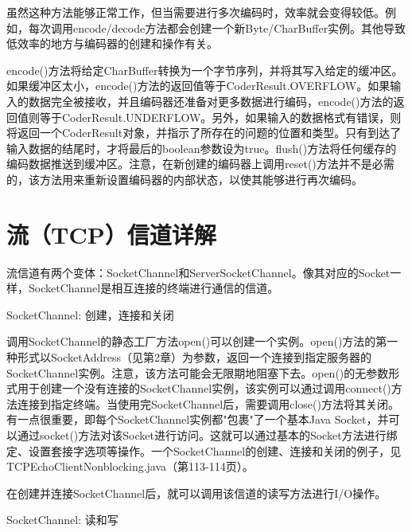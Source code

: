 		

		虽然这种方法能够正常工作，但当需要进行多次编码时，效率就会变得较低。例如，每次调用encode/decode方法都会创建一个新Byte/CharBuffer实例。其他导致低效率的地方与编码器的创建和操作有关。 

		

		encode()方法将给定CharBuffer转换为一个字节序列，并将其写入给定的缓冲区。如果缓冲区太小，encode()方法的返回值等于CoderResult.OVERFLOW。如果输入的数据完全被接收，并且编码器还准备对更多数据进行编码，encode()方法的返回值则等于CoderResult.UNDERFLOW。另外，如果输入的数据格式有错误，则将返回一个CoderResult对象，并指示了所存在的问题的位置和类型。只有到达了输入数据的结尾时，才将最后的boolean参数设为true。flush()方法将任何缓存的编码数据推送到缓冲区。注意，在新创建的编码器上调用reset()方法并不是必需的，该方法用来重新设置编码器的内部状态，以使其能够进行再次编码。 

\section{流（TCP）信道详解} 

	流信道有两个变体：SocketChannel和ServerSocketChannel。像其对应的Socket一样，SocketChannel是相互连接的终端进行通信的信道。 

	SocketChannel: 创建，连接和关闭 

	

	调用SocketChannel的静态工厂方法open()可以创建一个实例。open()方法的第一种形式以SocketAddress（见第2章）为参数，返回一个连接到指定服务器的SocketChannel实例。注意，该方法可能会无限期地阻塞下去。open()的无参数形式用于创建一个没有连接的SocketChannel实例，该实例可以通过调用connect()方法连接到指定终端。当使用完SocketChannel后，需要调用close()方法将其关闭。有一点很重要，即每个SocketChannel实例都"包裹"了一个基本Java Socket，并可以通过socket()方法对该Socket进行访问。这就可以通过基本的Socket方法进行绑定、设置套接字选项等操作。一个SocketChannel的创建、连接和关闭的例子，见TCPEchoClientNonblocking.java（第113-114页）。

	在创建并连接SocketChannel后，就可以调用该信道的读写方法进行I/O操作。 

	SocketChannel: 读和写 

	

